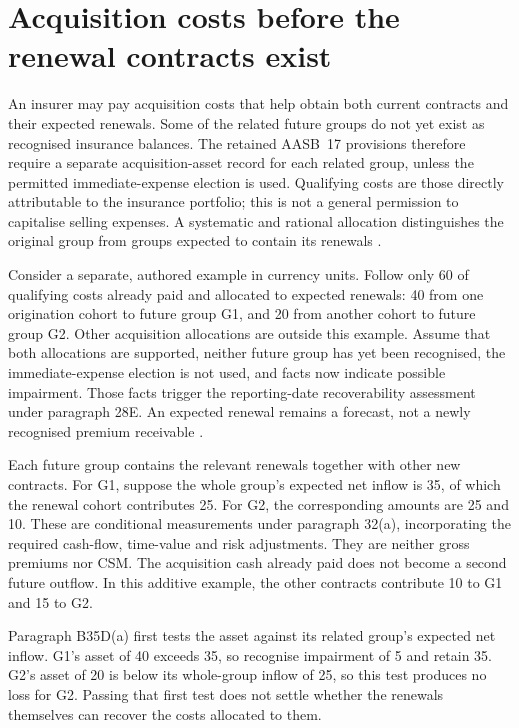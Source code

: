 \clearpage
\section{Acquisition costs before the renewal contracts exist}
\label{sec:insurance-acquisition-recoverability}

An insurer may pay acquisition costs that help obtain both current contracts
and their expected renewals. Some of the related future groups do not yet
exist as recognised insurance balances. The retained AASB~17 provisions
therefore require a separate acquisition-asset record for each related group,
unless the permitted immediate-expense election is used. Qualifying costs
are those directly attributable to the insurance portfolio; this is not a
general permission to capitalise selling expenses. A systematic and rational
allocation distinguishes the original group from groups expected to contain
its renewals \citep[paragraphs 28A--28B, B35A and Appendix A]{aasb17}.

Consider a separate, authored example in currency units. Follow only 60 of
qualifying costs already paid and allocated to expected renewals: 40 from
one origination cohort to future group G1, and 20 from another cohort to
future group G2. Other acquisition allocations are outside this example.
Assume that both allocations are supported, neither future group has yet
been recognised, the immediate-expense election is not used, and facts now
indicate possible impairment. Those facts trigger the reporting-date
recoverability assessment under paragraph 28E. An expected renewal remains
a forecast, not a newly recognised premium receivable
\citep[paragraphs 28B, 28E and 35]{aasb17}.

Each future group contains the relevant renewals together with other new
contracts. For G1, suppose the whole group's expected net inflow is 35,
of which the renewal cohort contributes 25. For G2, the corresponding
amounts are 25 and 10. These are conditional measurements under paragraph
32(a), incorporating the required cash-flow, time-value and risk adjustments.
They are neither gross premiums nor CSM. The acquisition cash already paid
does not become a second future outflow. In this additive example, the
other contracts contribute 10 to G1 and 15 to G2.

Paragraph B35D(a) first tests the asset against its related group's expected
net inflow. G1's asset of 40 exceeds 35, so recognise impairment of 5 and
retain 35. G2's asset of 20 is below its whole-group inflow of 25, so this
test produces no loss for G2. Passing that first test does not settle whether
the renewals themselves can recover the costs allocated to them.

